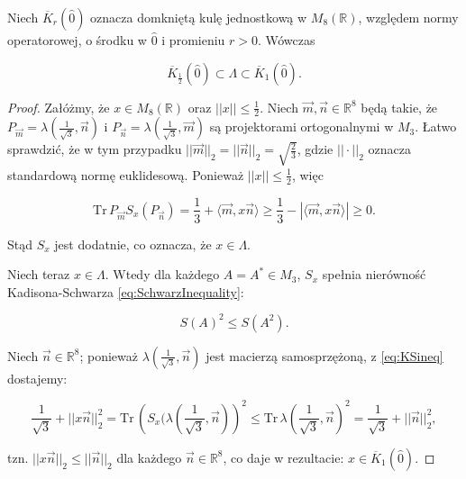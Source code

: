 {\begin{Theorem}
\label{thm:LambdaAndBalls}
Niech $\overline{K}_{r}(\hat{0})$ oznacza domkniętą kulę jednostkową
w $M_{8}(\mathbb{R})$, względem normy operatorowej,
o środku w $\hat{0}$ i promieniu $r > 0$.
Wówczas
\begin{linenomath*}
 \begin{equation}
        \overline{K}_{\frac{1}{2}}(\hat{0})
            \subset \Lambda \subset \overline{K}_{1}(\hat{0}).
     \end{equation}
\end{linenomath*}
\end{Theorem}
\begin{proof}
    Załóżmy, że $x \in M_{8}(\mathbb{R})$ oraz $||x|| \leq \frac{1}{2}$.
    Niech $\vec{m}, \vec{n} \in \mathbb{R}^{8}$ będą takie, że
    $P_{\vec{m}} = \lambda(\frac{1}{\sqrt{3}}, \vec{n})$ i
    $P_{\vec{n}} = \lambda(\frac{1}{\sqrt{3}}, \vec{m})$
    są projektorami ortogonalnymi w $M_{3}$.
    Łatwo sprawdzić, że w tym przypadku
    $|| \vec{m} ||_{2} = || \vec{n} ||_{2} = \sqrt{\frac{2}{3}}$,
    gdzie  $|| \cdot||_{2}$ oznacza standardową normę euklidesową.
    Ponieważ $||x|| \leq \frac{1}{2}$, więc
\begin{linenomath*}
 \begin{equation}
        \text{Tr} \, P_{\vec{m}} S_{x}(P_{\vec{n}}) =
        \frac{1}{3} + \langle \vec{m}, x \vec{n} \rangle \geq
        \frac{1}{3} - |\langle \vec{m}, x \vec{n} \rangle| \geq 0.
 \end{equation}
\end{linenomath*}
Stąd $S_{x}$ jest dodatnie, co oznacza, że $x \in \Lambda$.

Niech teraz $x \in \Lambda$.
Wtedy dla każdego $A = A^{*} \in M_{3}$, $S_{x}$
spełnia nierówność Kadisona-Schwarza \eqref{eq:SchwarzInequality}:
    \begin{linenomath*}
 \begin{equation}
     \label{eq:KSineq}
        S(A)^{2} \leq S(A^{2}).
     \end{equation}
\end{linenomath*}
Niech $\vec{n} \in \mathbb{R}^{8}$;
ponieważ $\lambda(\frac{1}{\sqrt{3}}, \vec{n})$
jest macierzą samosprzężoną, z \eqref{eq:KSineq} dostajemy:
    \begin{linenomath*}
 \begin{equation}
        \frac{1}{\sqrt{3}} + || x \vec{n} ||_{2}^{2} = \text{Tr}\,
        \left ( S_{x}(\lambda(\frac{1}{\sqrt{3}}, \vec{n}) \right)^{2} \leq
        \text{Tr}\, \lambda(\frac{1}{\sqrt{3}}, \vec{n})^{2} =
        \frac{1}{\sqrt{3}} + ||\vec{n}||_{2}^{2},
     \end{equation}
\end{linenomath*}
tzn. $||x\vec{n}||_{2} \leq ||\vec{n}||_{2}$
dla każdego $\vec{n} \in \mathbb{R}^{8}$,
co daje w rezultacie: $x \in \overline{K}_{1}(\hat{0})$.
\end{proof}

}
